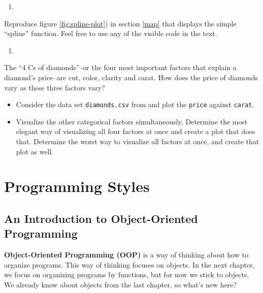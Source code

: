 \documentclass[
  12pt,
  krantz2]{krantz}
\providecommand{\tightlist}{%
  \setlength{\itemsep}{0pt}\setlength{\parskip}{0pt}}
\begin{document}
\begin{enumerate}
\def\labelenumi{\arabic{enumi}.}
\tightlist
\item
\end{enumerate}

Reproduce figure \ref{fig:spline-plot}) in section \ref{map} that displays the simple ``spline'' function. Feel free to use any of the visible code in the text.

\begin{enumerate}
\def\labelenumi{\arabic{enumi}.}
\setcounter{enumi}{1}
\tightlist
\item
\end{enumerate}

The ``4 Cs of diamonds''--or the four most important factors that explain a diamond's price--are cut, color, clarity and carat. How does the price of diamonds vary as these three factors vary?

\begin{itemize}
\tightlist
\item
  Consider the data set \texttt{diamonds.csv} from \citep{ggplot2} and plot the \texttt{price} against \texttt{carat}.
\item
  Visualize the other categorical factors simultaneously. Determine the most elegant way of visualizing all four factors at once and create a plot that does that. Determine the worst way to visualize all factors at once, and create that plot as well.
\end{itemize}

\hypertarget{part-programming-styles}{%
\part{Programming Styles}\label{part-programming-styles}}

\hypertarget{an-introduction-to-object-oriented-programming}{%
\chapter{An Introduction to Object-Oriented Programming}\label{an-introduction-to-object-oriented-programming}}

\textbf{Object-Oriented Programming (OOP)} is a way of thinking about how to organize programs. This way of thinking focuses on objects. In the next chapter, we focus on organizing programs by functions, but for now we stick to objects. We already know about objects from the last chapter, so what's new here?
\end{document}
